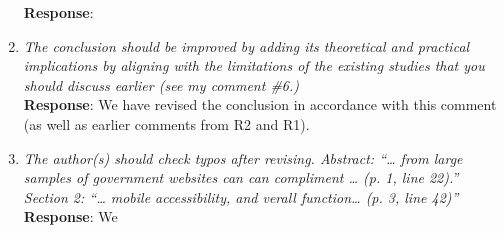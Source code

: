 \documentclass[12pt,titlepage]{article}
\begin{document}
\begin{enumerate}
    \textbf{Response}: 
    
        \item \emph{The conclusion should be improved by adding its theoretical and practical implications by aligning with the limitations of the existing studies that you should discuss earlier (see my comment \#6.)}\\

    \textbf{Response}:  We have revised the conclusion in accordance with this comment (as well as earlier comments from R2 and R1). 
    
    
            \item \emph{The author(s) should check typos after revising. Abstract: “… from large samples of government websites can can compliment … (p. 1, line 22).” Section 2: “… mobile accessibility, and verall function… (p. 3, line 42)”}\\

    \textbf{Response}: We 


    

\end{enumerate}





\newpage
\singlespacing
%
% 
\end{document}
